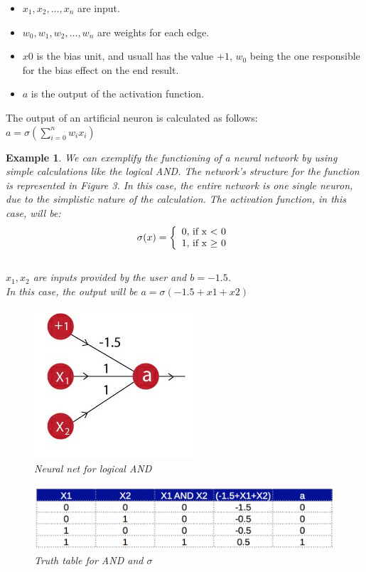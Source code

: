 \documentclass{article}
\newtheorem{example}{Example}[section]
\begin{document}
\begin{itemize}
	\item $x_1, x_2, ..., x_n$ are input. \\
	\item $w_0, w_1, w_2, ..., w_n$ are weights for each edge. \\
	\item $x0$ is the bias unit, and usuall has the value $+1$, $w_0$ being the one responsible for the bias effect on the end result.\\
	\item $a$ is the output of the activation function.\\
\end{itemize}

The output of an artificial neuron is calculated as follows:\\
$a = \sigma(\sum_{i=0}^n w_i x_i)$

\begin{example}
We can exemplify the functioning of a neural network by using simple calculations like the logical AND. The network's structure for the function is represented in Figure 3. In this case, the entire network is one single neuron, due to the simplistic nature of the calculation. The activation function, in this case, will be:\\
\[
	\sigma(x)= \left\{
	\begin{array}{ll}
	$0, if x $<$ 0$\\
	$1, if x $\geq$ 0$
	\end{array}
	\right.
\]\\
$x_1, x_2$ are inputs provided by the user and $b = -1.5$.\\
In this case, the output will be $a = \sigma(-1.5+x1+x2)$

\begin{figure}[H]
	\includegraphics[scale=0.5]{and_s}
	\caption{Neural net for logical AND \cite{Deep_Learning}}
\end{figure}

\begin{figure}[H]
	\includegraphics[scale=0.3]{and_table}
	\caption{Truth table for AND and $\sigma$ \cite{Deep_Learning}}
\end{figure}

\end{example}
\end{document}
